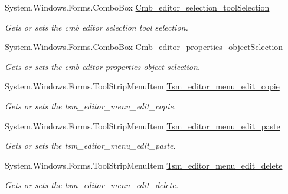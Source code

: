 \begin{DoxyCompactItemize}
System.\-Windows.\-Forms.\-Combo\-Box \hyperlink{class_a_rdev_kit_1_1_editor_window_a0937e4db376a67530e488c174d512925}{Cmb\-\_\-editor\-\_\-selection\-\_\-tool\-Selection}
\begin{DoxyCompactList}\small\item\em Gets or sets the cmb editor selection tool selection. \end{DoxyCompactList}\item 
System.\-Windows.\-Forms.\-Combo\-Box \hyperlink{class_a_rdev_kit_1_1_editor_window_a7a5f59a2277ea660f5ac354ed6563931}{Cmb\-\_\-editor\-\_\-properties\-\_\-object\-Selection}
\begin{DoxyCompactList}\small\item\em Gets or sets the cmb editor properties object selection. \end{DoxyCompactList}\item 
System.\-Windows.\-Forms.\-Tool\-Strip\-Menu\-Item \hyperlink{class_a_rdev_kit_1_1_editor_window_a7ce809e15aaf06e0d514989fb6292687}{Tsm\-\_\-editor\-\_\-menu\-\_\-edit\-\_\-copie}
\begin{DoxyCompactList}\small\item\em Gets or sets the tsm\-\_\-editor\-\_\-menu\-\_\-edit\-\_\-copie. \end{DoxyCompactList}\item 
System.\-Windows.\-Forms.\-Tool\-Strip\-Menu\-Item \hyperlink{class_a_rdev_kit_1_1_editor_window_ac2310f24fffc1c84b2c23c5e6cbd8156}{Tsm\-\_\-editor\-\_\-menu\-\_\-edit\-\_\-paste}
\begin{DoxyCompactList}\small\item\em Gets or sets the tsm\-\_\-editor\-\_\-menu\-\_\-edit\-\_\-paste. \end{DoxyCompactList}\item 
System.\-Windows.\-Forms.\-Tool\-Strip\-Menu\-Item \hyperlink{class_a_rdev_kit_1_1_editor_window_a94b80b86878dae463d966bd117732260}{Tsm\-\_\-editor\-\_\-menu\-\_\-edit\-\_\-delete}
\begin{DoxyCompactList}\small\item\em Gets or sets the tsm\-\_\-editor\-\_\-menu\-\_\-edit\-\_\-delete. \end{DoxyCompactList}\end{DoxyCompactItemize}


